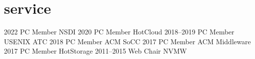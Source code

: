 \section{service}

\begin{entrylist}
    \eduentry
    {2022}
    {PC Member}
    {NSDI}
    \eduentry
    {2020}
    {PC Member}
    {HotCloud}
    \eduentry
    {2018--2019}
    {PC Member}
    {USENIX ATC}
    \eduentry
    {2018}
    {PC Member}
    {ACM SoCC}
    \eduentry
    {2017}
    {PC Member}
    {ACM Middleware}
    \eduentry
    {2017}
    {PC Member}
    {HotStorage}
    \eduentry
    {2011--2015}
    {Web Chair}
    {NVMW}
\end{entrylist}